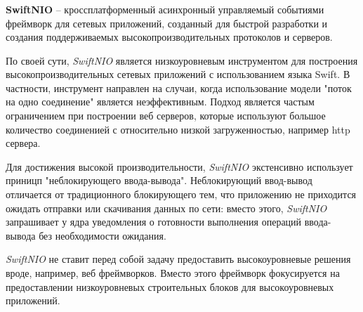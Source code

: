 \subsubsection{}
\label{sec:development:arch:pp:nio}

\textbf{SwiftNIO} -- кроссплатформенный асинхронный управляемый событиями фреймворк для сетевых приложений, созданный для быстрой разработки и создания поддерживаемых высокопроизводительных протоколов и серверов\cite{nio:github}.

По своей сути, \textit{SwiftNIO} является низкоуровневым инструментом для построения высокопроизводительных сетевых приложений с использованием языка Swift. В частности, инструмент направлен на случаи, когда использование модели "поток на одно соединение"  является неэффективным. Подход является частым ограничением при построении веб серверов, которые используют большое количество соединенией с относительно низкой загруженностью, например \gls{http} сервера.

Для достижения высокой производительности, \textit{SwiftNIO} экстенсивно использует приницп "неблокирующего ввода-вывода". Неблокирующий ввод-вывод отличается от традиционного блокирующего тем, что приложению не приходится ожидать отправки или скачивания данных по сети: вместо этого, \textit{SwiftNIO} запрашивает у ядра уведомления о готовности выполнения операций ввода-вывода без необходимости ожидания.

\textit{SwiftNIO} не ставит перед собой задачу предоставить высокоуровневые решения вроде, например, веб фреймворков. Вместо этого фреймворк фокусируется на предоставлении низкоуровневых строительных блоков для высокоуровневых приложений.